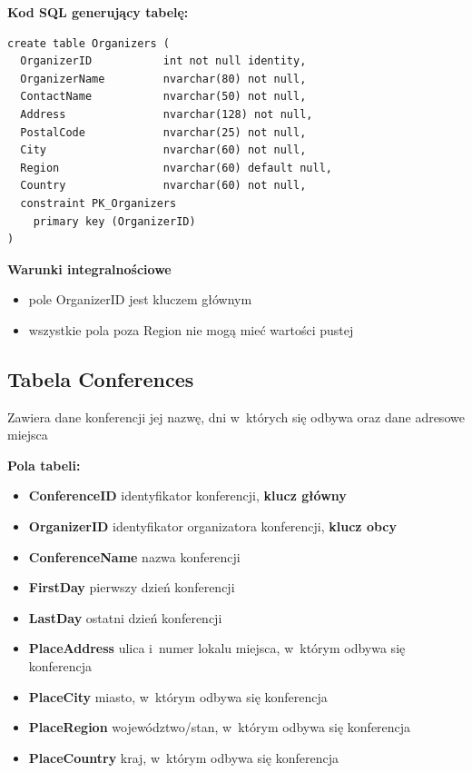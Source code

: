 \documentclass[12pt, a4paper]{mwrep}
\begin{document}
\vspace{0.5cm}
\noindent \textbf{Kod SQL generujący tabelę:}

\begin{lstlisting}
create table Organizers (
  OrganizerID           int not null identity,
  OrganizerName         nvarchar(80) not null,
  ContactName           nvarchar(50) not null,
  Address               nvarchar(128) not null,
  PostalCode            nvarchar(25) not null,
  City                  nvarchar(60) not null,
  Region                nvarchar(60) default null,
  Country               nvarchar(60) not null,
  constraint PK_Organizers 
    primary key (OrganizerID)
)
\end{lstlisting}

\vspace{0.5cm}
\noindent \textbf{Warunki integralnościowe}
\begin{itemize}
  \item pole OrganizerID jest kluczem głównym
  \item wszystkie pola poza Region nie mogą mieć wartości pustej
\end{itemize}

\newpage
\subsection{Tabela Conferences}

\noindent Zawiera dane konferencji \ppauza jej nazwę, dni w~których się odbywa oraz dane adresowe miejsca

\vspace{0.5cm}

\noindent \textbf{Pola tabeli:}
\begin{itemize}
  \item \textbf{ConferenceID} \ppauza identyfikator konferencji, \textbf{klucz główny}
  \item \textbf{OrganizerID} \ppauza identyfikator organizatora konferencji, \textbf{klucz obcy}
  \item \textbf{ConferenceName} \ppauza nazwa konferencji
  \item \textbf{FirstDay} \ppauza pierwszy dzień konferencji
  \item \textbf{LastDay} \ppauza ostatni dzień konferencji
  \item \textbf{PlaceAddress} \ppauza ulica i~numer lokalu miejsca, w~którym odbywa się konferencja
  \item \textbf{PlaceCity} \ppauza miasto, w~którym odbywa się konferencja
  \item \textbf{PlaceRegion} \ppauza województwo/stan, w~którym odbywa się konferencja
  \item \textbf{PlaceCountry} \ppauza kraj, w~którym odbywa się konferencja
\end{itemize}
\end{document}
